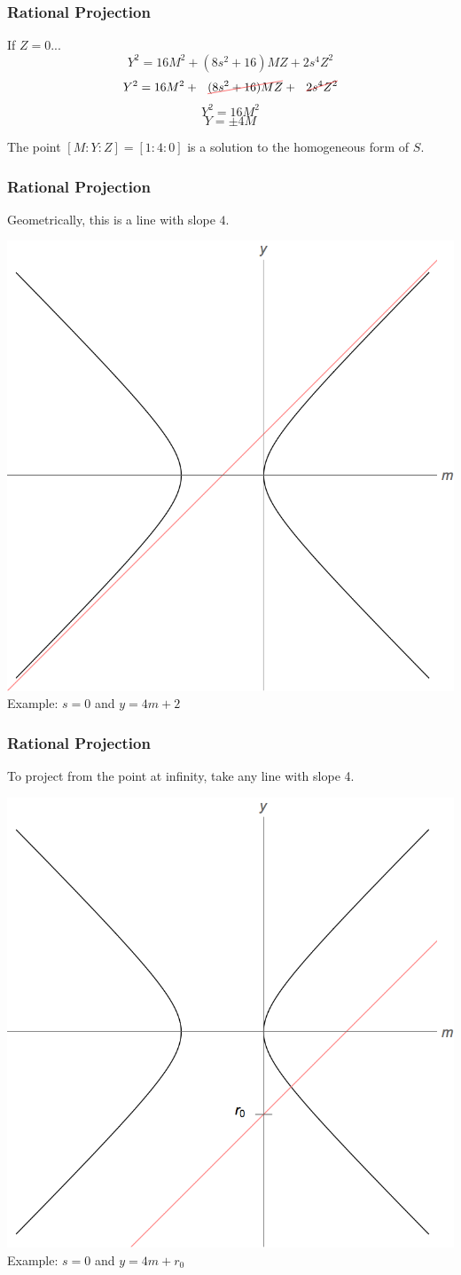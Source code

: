 \begin{frame}
	\frametitle{Rational Projection}
	If $Z=0$...
	\pause
	$$Y^2 = 16 M^2 + (8 s^2 + 16) M Z + 2 s^4 Z^2$$
	\pause
	$$Y^2 = 16 M^2 +\text{ \hcancel{\ensuremath{(8 s^2 + 16) M Z}}} + \text{ \hcancel{\ensuremath{2 s^4 Z^2}}}$$
	\pause
	$$ Y^2 = 16 M^2 $$
	\pause
	$$ Y=\pm 4 M$$
	\pause
	\begin{obs}
	The point $[M:Y:Z]=[1:4:0]$ is a solution to the homogeneous form of $S$.
	\end{obs}
\end{frame}

\begin{frame}
	\frametitle{Rational Projection}
	Geometrically, this is a line with slope $4$.
	\begin{center}
		\includegraphics[width=.6\textwidth]{s0AsymptotePlot.png} \\
		Example: $s=0$ and $y=4m+2$
	\end{center}
\end{frame}

\begin{frame}
	\frametitle{Rational Projection}
	To project from the point at infinity, take any line with slope 4.
	\begin{center}
		\includegraphics[width=.6\textwidth]{s0ProjectionPlot.png} \\
		Example: $s=0$ and $y=4m+r_0$
	\end{center}
\end{frame}

